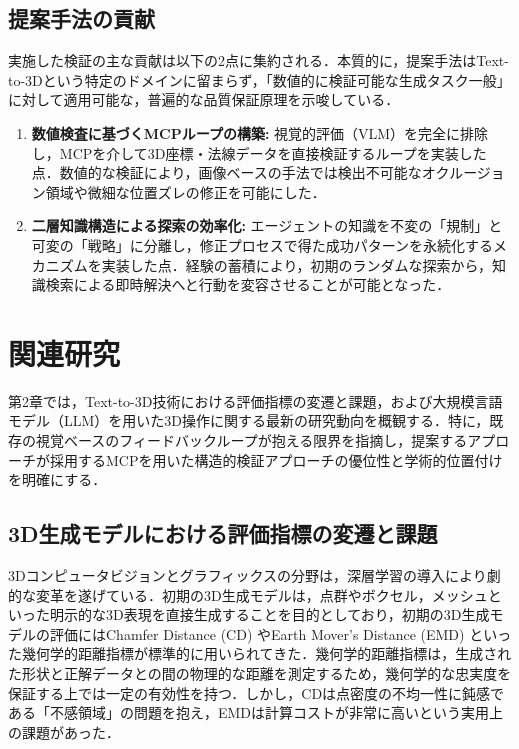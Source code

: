 \documentclass[dvipdfmx, a4paper, 9pt]{deimj}
\begin{document}
\subsection{提案手法の貢献}

実施した検証の主な貢献は以下の2点に集約される．本質的に，提案手法はText-to-3Dという特定のドメインに留まらず，「数値的に検証可能な生成タスク一般」に対して適用可能な，普遍的な品質保証原理を示唆している．
\begin{enumerate}
    \item \textbf{数値検査に基づくMCPループの構築:} 
    視覚的評価（VLM）を完全に排除し，MCPを介して3D座標・法線データを直接検証するループを実装した点．数値的な検証により，画像ベースの手法では検出不可能なオクルージョン領域や微細な位置ズレの修正を可能にした．
    \item \textbf{二層知識構造による探索の効率化:} 
    エージェントの知識を不変の「規制」と可変の「戦略」に分離し，修正プロセスで得た成功パターンを永続化するメカニズムを実装した点．経験の蓄積により，初期のランダムな探索から，知識検索による即時解決へと行動を変容させることが可能となった．
\end{enumerate}

\section{関連研究}

第2章では，Text-to-3D技術における評価指標の変遷と課題，および大規模言語モデル（LLM）を用いた3D操作に関する最新の研究動向を概観する．特に，既存の視覚ベースのフィードバックループが抱える限界を指摘し，提案するアプローチが採用するMCPを用いた構造的検証アプローチの優位性と学術的位置付けを明確にする．

\subsection{3D生成モデルにおける評価指標の変遷と課題}

3Dコンピュータビジョンとグラフィックスの分野は，深層学習の導入により劇的な変革を遂げている．初期の3D生成モデルは，点群やボクセル，メッシュといった明示的な3D表現を直接生成することを目的としており，初期の3D生成モデルの評価にはChamfer Distance (CD) やEarth Mover's Distance (EMD) といった幾何学的距離指標が標準的に用いられてきた\cite{fan2017point,nichol2022point}．幾何学的距離指標は，生成された形状と正解データとの間の物理的な距離を測定するため，幾何学的な忠実度を保証する上では一定の有効性を持つ．しかし，CDは点密度の不均一性に鈍感である「不感領域」の問題を抱え，EMDは計算コストが非常に高いという実用上の課題があった．
\end{document}

